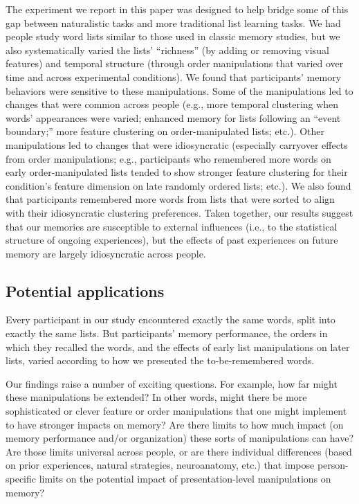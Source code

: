 \documentclass[11pt]{article}
\begin{document}
The experiment we report in this paper was designed to help bridge some of this
gap between naturalistic tasks and more traditional list learning tasks. We had
people study word lists similar to those used in classic memory studies, but we
also systematically varied the lists' ``richness'' (by adding or removing
visual features) and temporal structure (through order manipulations that
varied over time and across experimental conditions). We found that
participants' memory behaviors were sensitive to these manipulations. Some of
the manipulations led to changes that were common across people (e.g., more
temporal clustering when words' appearances were varied; enhanced memory for
lists following an ``event boundary;'' more feature clustering on
order-manipulated lists; etc.). Other manipulations led to changes that were
idiosyncratic (especially carryover effects from order manipulations; e.g.,
participants who remembered more words on early order-manipulated lists tended
to show stronger feature clustering for their condition's feature dimension on
late randomly ordered lists; etc.). We also found that participants remembered
more words from lists that were sorted to align with their idiosyncratic
clustering preferences. Taken together, our results suggest that our memories
are susceptible to external influences (i.e., to the statistical structure of
ongoing experiences), but the effects of past experiences on future memory are
largely idiosyncratic across people.


\subsection*{Potential applications}

Every participant in our study encountered exactly the same words, split into
exactly the same lists. But participants' memory performance, the orders in
which they recalled the words, and the effects of early list manipulations on
later lists, varied according to how we presented the to-be-remembered words.

Our findings raise a number of exciting questions. For example, how far might
these manipulations be extended? In other words, might there be more
sophisticated or clever feature or order manipulations that one might implement
to have stronger impacts on memory? Are there limits to how much impact (on
memory performance and/or organization) these sorts of manipulations can have?
Are those limits universal across people, or are there individual differences
(based on prior experiences, natural strategies, neuroanatomy, etc.) that
impose person-specific limits on the potential impact of presentation-level
manipulations on memory?
\end{document}
